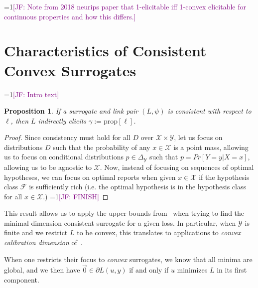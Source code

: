 \documentclass{article}
\newcommand{\Comments}{1}
\newcommand{\mynote}[2]{\ifnum\Comments=1\textcolor{#1}{#2}\fi}
\newcommand{\jessie}[1]{\mynote{purple}{[JF: #1]}}
\newcommand{\reals}{\mathbb{R}}
\newcommand{\simplex}{\Delta_\Y}
\newcommand{\prop}[1]{\mathrm{prop}[#1]}
\newcommand{\F}{\mathcal{F}}
\newcommand{\X}{\mathcal{X}}
\newcommand{\Y}{\mathcal{Y}}
\newcommand{\inprod}[2]{\langle #1, #2 \rangle}
\newtheorem{theorem}{Theorem}
\newtheorem{proposition}{Proposition}
\newtheorem{corollary}{Corollary}
\DeclareMathOperator*{\arginf}{arg\,inf}
\begin{document}
\jessie{Note from 2018 neurips paper that 1-elicitable iff 1-convex elicitable for continuous properties and how this differs.}


\section{Characteristics of Consistent Convex Surrogates}\label{sec:char-convex}
\jessie{Intro text}
\begin{proposition}\label{prop:consistent-implies-indir-elic}
	If a surrogate and link pair $(L, \psi)$ is consistent with respect to $\ell$, then $L$ indirectly elicits $\gamma := \prop{\ell}$.
\end{proposition}
\begin{proof}
Since consistency must hold for all $D$ over $\X \times \Y$, let us focus on distributions $D$ such that the probability of any $x \in \X$ is a point mass, allowing us to focus on conditional distributions $p \in \simplex$ such that $p = Pr[Y = y | X = x]$, allowing us to be agnostic to $\X$.
Now, instead of focusing on sequences of optimal hypotheses, we can focus on optimal reports when given $x \in \X$ if the hypothesis class $\F$ is sufficiently rich (i.e. the optimal hypothesis is in the hypothesis class for all $x \in \X$.)
 \jessie{FINISH}
\end{proof}

This result allows us to apply the upper bounds from~\cite{frongillo2015elicitation} when trying to find the minimal dimension consistent surrogate for a given loss.
In particular, when $\Y$ is finite and we restrict $L$ to be convex, this translates to applications to \emph{convex calibration dimension} of~\cite{ramaswamy2016convex}.


When one restricts their focus to \emph{convex} surrogates, we know that all minima are global, and we then have $\vec 0  \in \partial L(u, y)$ if and only if $u$ minimizes $L$ in its first component.

%
\end{document}
